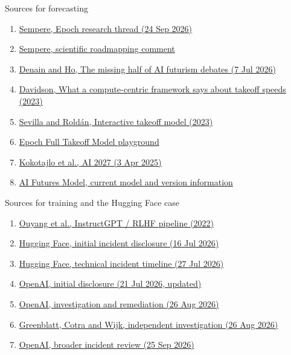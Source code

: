 \documentclass[aspectratio=169,11pt]{beamer}
\begin{document}
\begin{frame}[t,label=refsforecast]{Sources for forecasting}
\footnotesize\begin{enumerate}\setlength{\itemsep}{2mm}
\item \href{https://x.com/NunoSempere/status/2103155734586220630}{Sempere, Epoch research thread (24 Sep 2026)}
\item \href{https://x.com/NunoSempere/status/2103224315776774423}{Sempere, scientific roadmapping comment}
\item \href{https://epoch.ai/gradient-updates/the-missing-half-of-ai-futurism-debates}{Denain and Ho, The missing half of AI futurism debates (7 Jul 2026)}
\item \href{https://coefficientgiving.org/research/what-a-compute-centric-framework-says-about-takeoff-speeds/}{Davidson, What a compute-centric framework says about takeoff speeds (2023)}
\item \href{https://epoch.ai/latest/interactive-model-of-takeoff-speeds}{Sevilla and Roldán, Interactive takeoff model (2023)}
\item \href{https://takeoffspeeds.com/}{Epoch Full Takeoff Model playground}
\item \href{https://ai-2027.com/}{Kokotajlo et al., AI 2027 (3 Apr 2025)}
\item \href{https://www.aifuturesmodel.com/}{AI Futures Model, current model and version information}
\end{enumerate}
\end{frame}

\begin{frame}[t,label=refscase]{Sources for training and the Hugging Face case}
\footnotesize\begin{enumerate}\setlength{\itemsep}{2mm}
\item \href{https://arxiv.org/abs/2203.02155}{Ouyang et al., InstructGPT / RLHF pipeline (2022)}
\item \href{https://huggingface.co/blog/security-incident-july-2026}{Hugging Face, initial incident disclosure (16 Jul 2026)}
\item \href{https://huggingface.co/blog/agent-intrusion-technical-timeline}{Hugging Face, technical incident timeline (27 Jul 2026)}
\item \href{https://openai.com/index/hugging-face-model-evaluation-security-incident/}{OpenAI, initial disclosure (21 Jul 2026, updated)}
\item \href{https://openai.com/index/hugging-face-incident-and-the-road-ahead/}{OpenAI, investigation and remediation (26 Aug 2026)}
\item \href{https://metr.org/blog/2026-08-26-openai-hugging-face-incident-investigation/}{Greenblatt, Cotra and Wijk, independent investigation (26 Aug 2026)}
\item \href{https://openai.com/hugging-face-incident-and-misalignment/}{OpenAI, broader incident review (25 Sep 2026)}
\end{enumerate}
\end{frame}
\end{document}
